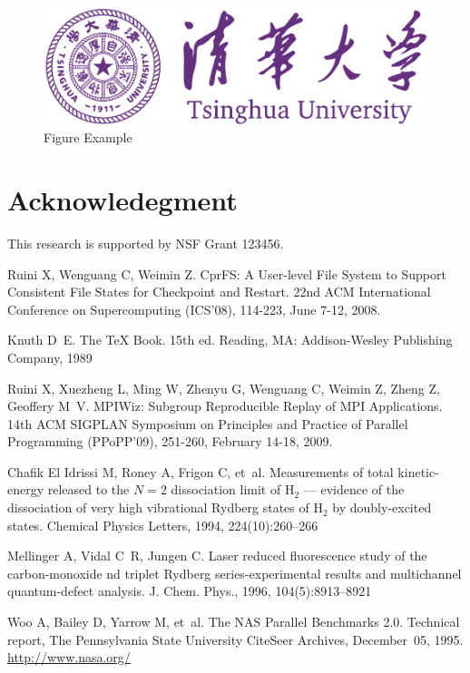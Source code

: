 \documentclass{ics}
\begin{document}
\begin{figure}
  \centering
  \includegraphics[width=.8\linewidth]{thu-whole-logo}
  \caption{Figure Example}
  \label{fig:example}
\end{figure}

\section*{Acknowledegment}
\label{sec:acknowledegment}
This research is supported by NSF Grant 123456.

% 
% 
% 

\begin{thebibliography}{99}

 Ruini X, Wenguang C, Weimin Z. CprFS: A User-level File System
  to Support Consistent File States for Checkpoint and Restart. 22nd ACM
  International Conference on Supercomputing (ICS'08), 114-223, June 7-12, 2008.

 Knuth D~E. The {\TeX} Book. 15th ed. Reading, MA: Addison-Wesley
  Publishing Company, 1989

 Ruini X, Xuezheng L, Ming W, Zhenyu G, Wenguang C, Weimin Z,
  Zheng Z, Geoffery M~V. MPIWiz: Subgroup Reproducible Replay of MPI
  Applications. 14th ACM SIGPLAN Symposium on Principles and Practice of
  Parallel Programming (PPoPP'09), 251-260, February 14-18, 2009.

 {Chafik El Idrissi} M, Roney A, Frigon C, et~al. Measurements
  of total kinetic-energy released to the {$N=2$} dissociation limit of {H}$_2$
  --- evidence of the dissociation of very high vibrational {R}ydberg states of
  {H}$_2$ by doubly-excited states. Chemical Physics Letters, 1994,
  224(10):260--266

 Mellinger A, Vidal C~R, Jungen C.  Laser reduced
  fluorescence study of the carbon-monoxide nd triplet {R}ydberg
  series-experimental results and multichannel quantum-defect analysis.
  J. Chem. Phys., 1996, 104(5):8913--8921

 Woo A, Bailey D, Yarrow M, et~al. The {NAS} Parallel Benchmarks
  2.0. Technical report, The Pennsylvania State University CiteSeer Archives,
  December~05, 1995. \url{http://www.nasa.org/}
\end{thebibliography}
\end{document}

